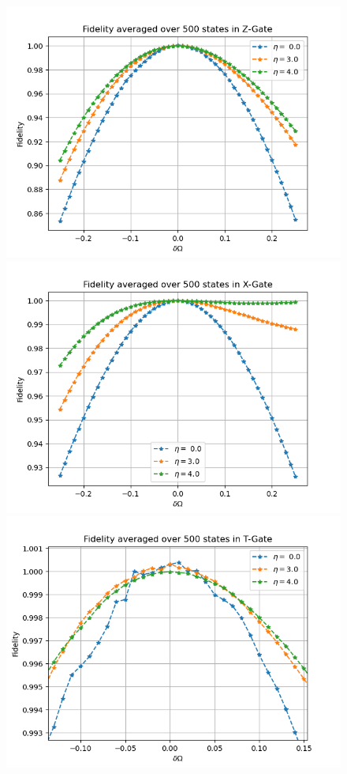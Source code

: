 \begin{figure}[H]
\includegraphics[scale=0.45]{figures/fid-Z-gate.png}
\includegraphics[scale=0.45]{figures/fid-X-gate.png}
\includegraphics[scale=0.45]{figures/fid-T-gate.png}

\end{figure}
